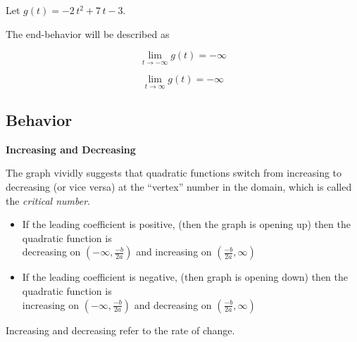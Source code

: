 \documentclass{ximera}
\begin{document}
\begin{example}

Let $g(t) = -2 \, t^2 + 7 \, t - 3$. 


The end-behavior will be described as 

\[
\lim\limits_{t \to -\infty} g(t) = -\infty
\]


\[
\lim\limits_{t \to \infty} g(t) = -\infty
\]

\end{example}

















\subsection*{Behavior}



\textbf{\textcolor{blue!55!black}{Increasing and Decreasing}}






The graph vividly suggests that quadratic functions switch from increasing to decreasing (or vice versa) at the ``vertex'' number in the domain, which is called the \textit{critical number}.


\begin{itemize}
\item If the leading coefficient is positive, (then the graph is opening up) then the quadratic function is \\

decreasing on $\left( -\infty, \frac{-b}{2a} \right)$ and increasing on $\left( \frac{-b}{2a}, \infty \right)$

\item If the leading coefficient is negative, (then graph is opening down) then the quadratic function is \\

increasing on $\left( -\infty, \frac{-b}{2a} \right)$ and decreasing on $\left( \frac{-b}{2a}, \infty \right)$
\end{itemize}





Increasing and decreasing refer to the rate of change.
\end{document}
